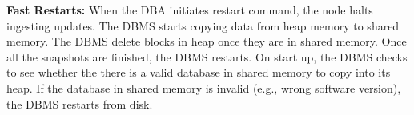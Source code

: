\documentclass[11pt]{article}
\begin{document}
\textbf{Fast Restarts:} When the DBA initiates restart command, the node halts ingesting updates. The DBMS starts copying data from heap memory to shared memory. The DBMS delete blocks in heap once they are in shared memory. Once all the snapshots are finished, the DBMS restarts. On start up, the DBMS checks to see whether the there is a valid database in shared memory to copy into its heap. If the database in shared memory is invalid (e.g., wrong software version), the DBMS restarts from disk.
\newpage


\end{document}
